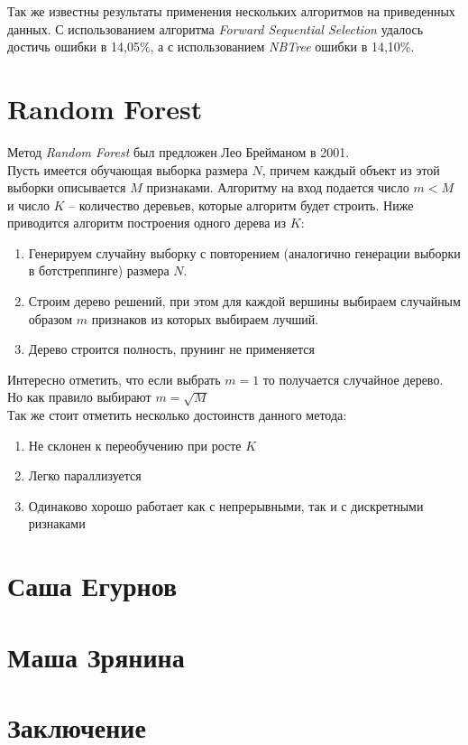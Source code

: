 \documentclass[12pt,a4paper]{article}
\begin{document}
Так же известны результаты применения нескольких алгоритмов на приведенных данных. С использованием алгоритма {\it Forward Sequential Selection} \cite{langley+sage} удалось достичь ошибки в 14,05\%, а с использованием {\it NBTree} \cite{kohavi} ошибки в 14,10\%.

\section{Random Forest}
\label{sec:randomforest}

Метод {\it Random Forest} \cite{breiman} был предложен Лео Брейманом в 2001.\\

Пусть имеется обучающая выборка размера $N$, причем каждый объект из этой выборки описывается $M$ признаками.
Алгоритму на вход подается число $m < M$ и число $K$ -- количество деревьев, которые алгоритм будет строить.
Ниже приводится алгоритм построения одного дерева из $K$:
\begin{enumerate}
    \item Генерируем случайну выборку с повторением (аналогично генерации выборки в ботстреппинге) размера $N$.
    \item Строим дерево решений, при этом для каждой вершины выбираем случайным образом $m$ признаков из которых выбираем лучший.
    \item Дерево строится полность, прунинг не применяется
\end{enumerate}

Интересно отметить, что если выбрать $m=1$ то получается случайное дерево. Но как правило выбирают $m = \sqrt M$\\

Так же стоит отметить несколько достоинств данного метода:
\begin{enumerate}
    \item Не склонен к переобучению при росте $K$
    \item Легко параллизуется
    \item Одинаково хорошо работает как с непрерывными, так и с дискретными ризнаками
\end{enumerate}

\section{Саша Егурнов}
\label{sec:sashaegurnov}

\section{Маша Зрянина}
\label{sec:mashazryanina}

\section{Заключение}
\label{sec:conclusion}



\end{document}
